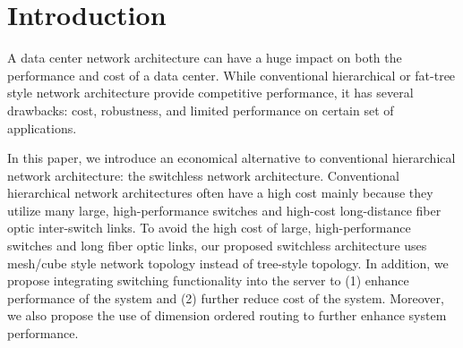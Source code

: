 \section{Introduction}
\label{sec:intro}
A data center network architecture can have a huge impact on both the performance and cost of a data center. While conventional hierarchical or fat-tree style network architecture provide competitive performance, it has several drawbacks: cost, robustness, and limited performance on certain set of applications. 

In this paper, we introduce an economical alternative to conventional hierarchical network architecture: the switchless network architecture. Conventional hierarchical network architectures often have a high cost mainly because they utilize many large, high-performance switches and high-cost long-distance fiber optic inter-switch links. To avoid the high cost of large, high-performance switches and long fiber optic links, our proposed switchless architecture uses mesh/cube style network topology instead of tree-style topology. In addition, we propose integrating switching functionality into the server to (1) enhance performance of the system and (2) further reduce cost of the system. Moreover, we also propose the use of dimension ordered routing to further enhance system performance.
